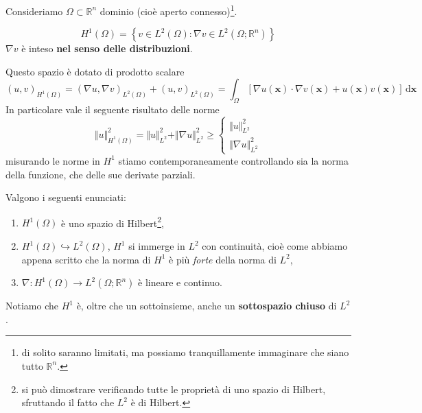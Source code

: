 \documentclass[10pt,a4paper,twoside,openright]{book}
\newcommand{\x}{\mathbf{x}}
\newcommand{\de}{\,\mathrm d}
\newcommand{\dxx}{\de \x}
\begin{document}
Consideriamo $\Omega \subset \mathbb{R}^{n}$ dominio (cioè aperto connesso)\footnote{di solito saranno limitati, ma possiamo tranquillamente immaginare che siano tutto $\mathbb{R}^{n}$.}.
\begin{definition}
    \begin{equation*}
        H^{1}(\Omega) =\left\{v\in L^{2}(\Omega) :\nabla v\in L^{2}\left(\Omega ;\mathbb{R}^{n}\right)\right\}
    \end{equation*}
    $\nabla v$ è inteso \textbf{nel senso delle distribuzioni}.
\end{definition}
Questo spazio è dotato di prodotto scalare
\begin{equation*}
    (u,v)_{H^{1}(\Omega)} =(\nabla u,\nabla v)_{L^{2}(\Omega)} +(u,v)_{L^{2}(\Omega)} =\int _{\Omega }[ \nabla u(\x) \cdotp \nabla v(\x) +u(\x) v(\x)] \dxx
\end{equation*}
In particolare vale il seguente risultato delle norme
\begin{equation*}
    \Vert u\Vert ^{2}_{H^{1}(\Omega)} =\Vert u\Vert ^{2}_{L^{2}} +\Vert \nabla u\Vert ^{2}_{L^{2}} \geqslant \begin{cases}
        \Vert u\Vert ^{2}_{L^{2}} \\
        \Vert \nabla u\Vert ^{2}_{L^{2}}
    \end{cases}
\end{equation*}
misurando le norme in $H^{1}$ stiamo contemporaneamente controllando sia la norma della funzione, che delle sue derivate parziali.
\begin{theorem}
    [Microteorema]
    Valgono i seguenti enunciati:
    \begin{enumerate}
        \item $H^{1}(\Omega)$ è uno spazio di Hilbert\footnote{si può dimostrare verificando tutte le proprietà di uno spazio di Hilbert, sfruttando il fatto che $L^{2}$ è di Hilbert.},
        \item $H^{1}(\Omega) \hookrightarrow L^{2}(\Omega)$, $H^{1}$ si immerge in $L^{2}$ con continuità, cioè come abbiamo appena scritto che la norma di $H^{1}$ è più \textit{forte} della norma di $L^{2}$,
        \item $\nabla :H^{1}(\Omega)\rightarrow L^{2}\left(\Omega ;\mathbb{R}^{n}\right)$ è lineare e continuo.
    \end{enumerate}
\end{theorem}

Notiamo che $H^{1}$ è, oltre che un sottoinsieme, anche un \textbf{sottospazio chiuso} di $L^{2}$.
\end{document}

